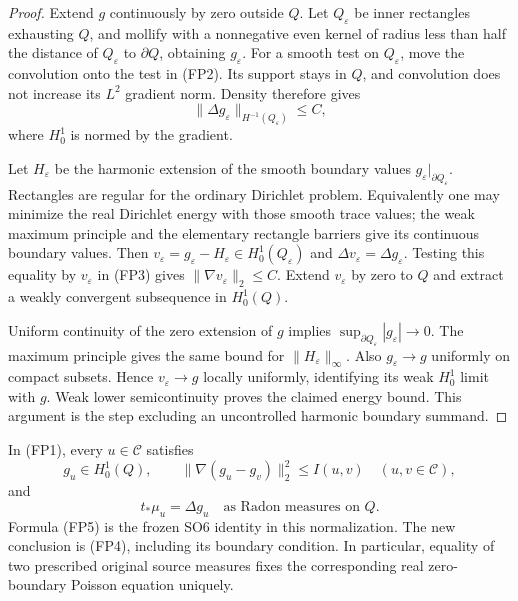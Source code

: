\begin{proof}
Extend $g$ continuously by zero outside $Q$. Let $Q_\varepsilon$
be inner rectangles exhausting $Q$, and mollify with a nonnegative
even kernel of radius less than half the distance of
$Q_\varepsilon$ to $\partial Q$, obtaining $g_\varepsilon$.
For a smooth test on $Q_\varepsilon$, move the convolution onto
the test in (FP2). Its support stays in $Q$, and convolution
does not increase its $L^2$ gradient norm. Density therefore gives
\[
 \|\Delta g_\varepsilon\|_{H^{-1}(Q_\varepsilon)}\le C,
 \tag{FP3}
\]
where $H_0^1$ is normed by the gradient.

Let $H_\varepsilon$ be the harmonic extension of the smooth
boundary values $g_\varepsilon|_{\partial Q_\varepsilon}$.
Rectangles are regular for the ordinary Dirichlet problem. Equivalently
one may minimize the real Dirichlet energy with those smooth trace
values; the weak maximum principle and the elementary rectangle
barriers give its continuous boundary values. Then
$v_\varepsilon=g_\varepsilon-H_\varepsilon\in
H_0^1(Q_\varepsilon)$ and
$\Delta v_\varepsilon=\Delta g_\varepsilon$. Testing this equality
by $v_\varepsilon$ in (FP3) gives
$\|\nabla v_\varepsilon\|_2\le C$.
Extend $v_\varepsilon$ by zero to $Q$ and extract a weakly
convergent subsequence in $H_0^1(Q)$.

Uniform continuity of the zero extension of $g$ implies
$\sup_{\partial Q_\varepsilon}|g_\varepsilon|\to0$.
The maximum principle gives the same bound for
$\|H_\varepsilon\|_\infty$. Also $g_\varepsilon\to g$ uniformly
on compact subsets. Hence $v_\varepsilon\to g$ locally uniformly,
identifying its weak $H_0^1$ limit with $g$. Weak lower
semicontinuity proves the claimed energy bound. This argument
is the step excluding an uncontrolled harmonic boundary summand.
\end{proof}

\begin{proposition}
In (FP1), every $u\in\mathscr C$ satisfies
\[
 g_u\in H_0^1(Q),\qquad
 \|\nabla(g_u-g_v)\|_2^2\le I(u,v)
                              \quad(u,v\in\mathscr C),
 \tag{FP4}
\]
and
\[
                         t_*\mu_u=\Delta g_u
                   \quad\text{as Radon measures on }Q.
 \tag{FP5}
\]
Formula (FP5) is the frozen SO6 identity in this normalization.
The new conclusion is (FP4), including its boundary condition.
In particular, equality of two prescribed original source measures
fixes the corresponding real zero-boundary Poisson equation uniquely.
\end{proposition}


